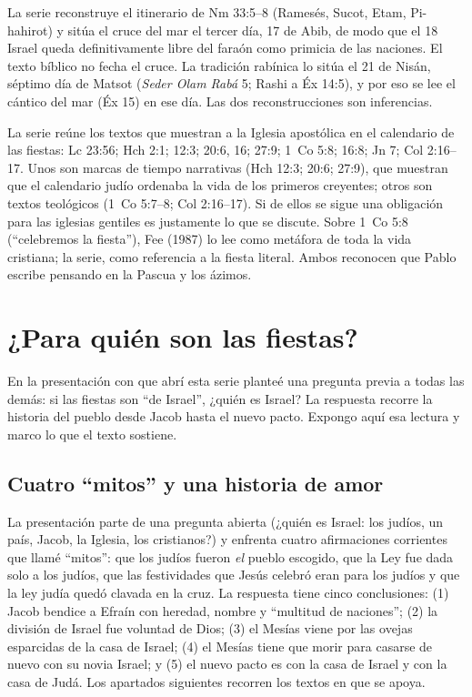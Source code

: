 \documentclass[11pt,letterpaper]{article}
\begin{document}
\begin{nota}
La serie reconstruye el itinerario de Nm 33:5--8 (Ramesés, Sucot, Etam, Pi-hahirot) y sitúa el cruce del mar el tercer día, 17 de Abib, de modo que el 18 Israel queda definitivamente libre del faraón como primicia de las naciones. El texto bíblico no fecha el cruce. La tradición rabínica lo sitúa el 21 de Nisán, séptimo día de Matsot (\emph{Seder Olam Rabá} 5; Rashi a Éx 14:5), y por eso se lee el cántico del mar (Éx 15) en ese día. Las dos reconstrucciones son inferencias.
\end{nota}

\begin{nota}
La serie reúne los textos que muestran a la Iglesia apostólica en el calendario de las fiestas: Lc 23:56; Hch 2:1; 12:3; 20:6, 16; 27:9; 1~Co 5:8; 16:8; Jn 7; Col 2:16--17. Unos son marcas de tiempo narrativas (Hch 12:3; 20:6; 27:9), que muestran que el calendario judío ordenaba la vida de los primeros creyentes; otros son textos teológicos (1~Co 5:7--8; Col 2:16--17). Si de ellos se sigue una obligación para las iglesias gentiles es justamente lo que se discute. Sobre 1~Co 5:8 (``celebremos la fiesta''), Fee (1987) lo lee como metáfora de toda la vida cristiana; la serie, como referencia a la fiesta literal. Ambos reconocen que Pablo escribe pensando en la Pascua y los ázimos.
\end{nota}

\section{¿Para quién son las fiestas?}\label{sec:paraquien}

En la presentación con que abrí esta serie planteé una pregunta previa a todas las demás: si las fiestas son ``de Israel'', ¿quién es Israel? La respuesta recorre la historia del pueblo desde Jacob hasta el nuevo pacto. Expongo aquí esa lectura y marco lo que el texto sostiene.

\subsection{Cuatro ``mitos'' y una historia de amor}
La presentación parte de una pregunta abierta (¿quién es Israel: los judíos, un país, Jacob, la Iglesia, los cristianos?) y enfrenta cuatro afirmaciones corrientes que llamé ``mitos'': que los judíos fueron \emph{el} pueblo escogido, que la Ley fue dada solo a los judíos, que las festividades que Jesús celebró eran para los judíos y que la ley judía quedó clavada en la cruz. La respuesta tiene cinco conclusiones: (1) Jacob bendice a Efraín con heredad, nombre y ``multitud de naciones''; (2) la división de Israel fue voluntad de Dios; (3) el Mesías viene por las ovejas esparcidas de la casa de Israel; (4) el Mesías tiene que morir para casarse de nuevo con su novia Israel; y (5) el nuevo pacto es con la casa de Israel y con la casa de Judá. Los apartados siguientes recorren los textos en que se apoya.
\end{document}
